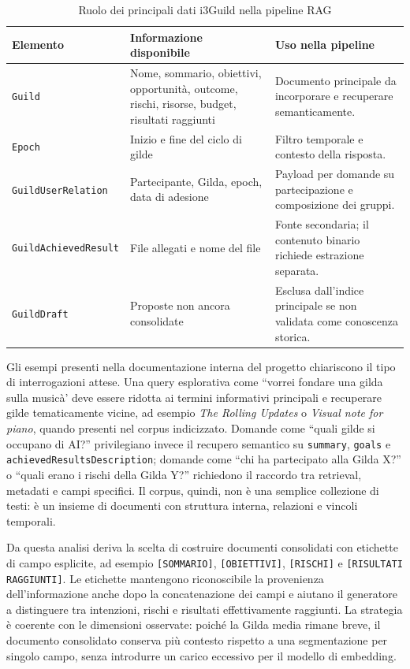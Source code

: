 \begin{table}[ht]
  \centering
  \caption{Ruolo dei principali dati i3Guild nella pipeline RAG}
  \label{tab:guild_retrieval_roles}
  \small
  \begin{tabular}{L{3.2cm}L{4.8cm}L{5.3cm}}
    \toprule
    \textbf{Elemento} & \textbf{Informazione disponibile} &
      \textbf{Uso nella pipeline} \\
    \midrule
    \texttt{Guild} & Nome, sommario, obiettivi, opportunità, outcome, rischi,
      risorse, budget, risultati raggiunti &
      Documento principale da incorporare e recuperare semanticamente. \\
    \texttt{Epoch} & Inizio e fine del ciclo di gilde &
      Filtro temporale e contesto della risposta. \\
    \texttt{GuildUserRelation} & Partecipante, Gilda, epoch, data di adesione &
      Payload per domande su partecipazione e composizione dei gruppi. \\
    \texttt{GuildAchievedResult} & File allegati e nome del file &
      Fonte secondaria; il contenuto binario richiede estrazione separata. \\
    \texttt{GuildDraft} & Proposte non ancora consolidate &
      Esclusa dall'indice principale se non validata come conoscenza storica. \\
    \bottomrule
  \end{tabular}
\end{table}

Gli esempi presenti nella documentazione interna del progetto chiariscono il
tipo di interrogazioni attese. Una query esplorativa come ``vorrei fondare una
gilda sulla musicà' deve essere ridotta ai termini informativi principali e
recuperare gilde tematicamente vicine, ad esempio \emph{The Rolling Updates} o
\emph{Visual note for piano}, quando presenti nel corpus indicizzato. Domande
come ``quali gilde si occupano di AI?'' privilegiano invece il recupero
semantico su \texttt{summary}, \texttt{goals} e \texttt{achievedResultsDescription};
domande come ``chi ha partecipato alla Gilda X?'' o ``quali erano i rischi
della Gilda Y?'' richiedono il raccordo tra retrieval, metadati e campi
specifici. Il corpus, quindi, non è una semplice collezione di testi: è un
insieme di documenti con struttura interna, relazioni e vincoli temporali.

Da questa analisi deriva la scelta di costruire documenti consolidati con
etichette di campo esplicite, ad esempio \texttt{[SOMMARIO]},
\texttt{[OBIETTIVI]}, \texttt{[RISCHI]} e
\texttt{[RISULTATI RAGGIUNTI]}. Le etichette mantengono riconoscibile la
provenienza dell'informazione anche dopo la concatenazione dei campi e aiutano
il generatore a distinguere tra intenzioni, rischi e risultati effettivamente
raggiunti. La strategia è coerente con le dimensioni osservate: poiché la Gilda
media rimane breve, il documento consolidato conserva più contesto rispetto a
una segmentazione per singolo campo, senza introdurre un carico eccessivo per
il modello di embedding.

